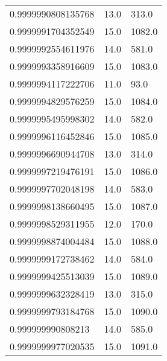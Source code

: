 \begin{center}
\begin{supertabular}[H]{p{0.30\textwidth}p{0.05\textwidth}p{0.05\textwidth}}
0.9999990808135768 & 13.0 & 313.0 \\ 
0.9999991704352549 & 15.0 & 1082.0 \\ 
0.9999992554611976 & 14.0 & 581.0 \\ 
0.9999993358916609 & 15.0 & 1083.0 \\ 
0.9999994117222706 & 11.0 & 93.0 \\ 
0.9999994829576259 & 15.0 & 1084.0 \\ 
0.9999995495998302 & 14.0 & 582.0 \\ 
0.9999996116452846 & 15.0 & 1085.0 \\ 
0.9999996690944708 & 13.0 & 314.0 \\ 
0.9999997219476191 & 15.0 & 1086.0 \\ 
0.9999997702048198 & 14.0 & 583.0 \\ 
0.9999998138660495 & 15.0 & 1087.0 \\ 
0.9999998529311955 & 12.0 & 170.0 \\ 
0.9999998874004484 & 15.0 & 1088.0 \\ 
0.9999999172738462 & 14.0 & 584.0 \\ 
0.9999999425513039 & 15.0 & 1089.0 \\ 
0.9999999632328419 & 13.0 & 315.0 \\ 
0.9999999793184768 & 15.0 & 1090.0 \\ 
0.999999990808213 & 14.0 & 585.0 \\ 
0.9999999977020535 & 15.0 & 1091.0 \\ 
\end{supertabular}
\end{center}
